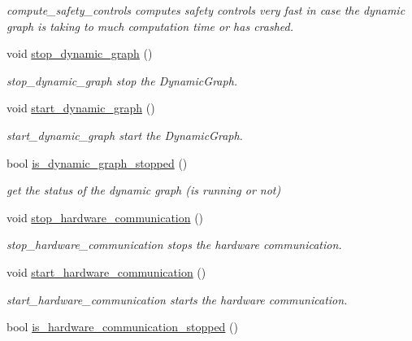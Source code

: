 \begin{DoxyCompactItemize}
\begin{DoxyCompactList}\small\item\em compute\+\_\+safety\+\_\+controls computes safety controls very fast in case the dynamic graph is taking to much computation time or has crashed. \end{DoxyCompactList}\item 
void \hyperlink{classdynamic__graph_1_1DynamicGraphManager_ad3c7c528ef283fbfb803377c8c631b4c}{stop\+\_\+dynamic\+\_\+graph} ()
\begin{DoxyCompactList}\small\item\em stop\+\_\+dynamic\+\_\+graph stop the Dynamic\+Graph. \end{DoxyCompactList}\item 
void \hyperlink{classdynamic__graph_1_1DynamicGraphManager_a1bfd2b965dde19d12d63f5928a4f670c}{start\+\_\+dynamic\+\_\+graph} ()
\begin{DoxyCompactList}\small\item\em start\+\_\+dynamic\+\_\+graph start the Dynamic\+Graph. \end{DoxyCompactList}\item 
bool \hyperlink{classdynamic__graph_1_1DynamicGraphManager_ab929d21277e5d2fba726b8ae422c27a8}{is\+\_\+dynamic\+\_\+graph\+\_\+stopped} ()
\begin{DoxyCompactList}\small\item\em get the status of the dynamic graph (is running or not) \end{DoxyCompactList}\item 
void \hyperlink{classdynamic__graph_1_1DynamicGraphManager_aabf11778fb69e5203d38c8093de60bab}{stop\+\_\+hardware\+\_\+communication} ()
\begin{DoxyCompactList}\small\item\em stop\+\_\+hardware\+\_\+communication stops the hardware communication. \end{DoxyCompactList}\item 
void \hyperlink{classdynamic__graph_1_1DynamicGraphManager_a234bef10fea6e3f9beb1580491127660}{start\+\_\+hardware\+\_\+communication} ()
\begin{DoxyCompactList}\small\item\em start\+\_\+hardware\+\_\+communication starts the hardware communication. \end{DoxyCompactList}\item 
bool \hyperlink{classdynamic__graph_1_1DynamicGraphManager_afcc53ebec6e5f2057c23a05894715125}{is\+\_\+hardware\+\_\+communication\+\_\+stopped} ()

\end{DoxyCompactItemize}
